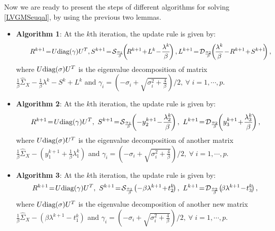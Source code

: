 \documentclass{mcom-l}
\theoremstyle{definition}
\theoremstyle{remark}
\numberwithin{equation}{section}
\begin{document}
Now we are ready to present the steps of different algorithms for solving \eqref{LVGMSeuqal}, by using the previous two lemmas.

 \begin{itemize}
\item {\bf Algorithm 1}: At the $k$th iteration, the update rule is given by:
{\small$$
\qquad R^{k+1} \!=\! U \hbox{diag}(\gamma) U^T, S^{k+1}\!=\!{\mathcal{S}}_{\frac{\alpha_1}{\beta}}\!\!\left(\! R^{k+1} \!+\! L^k \!-\! \frac{\lambda^k}{\beta} \!\right), L^{k+1} \!=\! {\mathcal{D}}_{\frac{\alpha_2}{\beta}}\!\!\left(\! \frac{\lambda^k}{\beta} \!-\! R^{k+1} \!+\! S^{k+1} \!\!\right),
$$}
where $U \hbox{diag}(\sigma)U^T$ is the eigenvalue decomposition of matrix $\frac{1}{\beta}\hat{\Sigma}_{X} \!-\! \frac{1}{\beta}\lambda^k \!-\! S^k \!+\! L^k$ and
$\gamma_i = \left( -\sigma_i + \sqrt{\sigma_i^2 + \frac{4}{\beta}} \right)/2,\ \forall \;i = 1,\cdots,p.$

\item {\bf{Algorithm 2}}: At the $k$th iteration, the update rule is given by:
{\small$$
\qquad R^{k+1}\!=\! U \hbox{diag}(\gamma) U^T,\  S^{k+1}\!=\!{\mathcal{S}}_{\frac{\alpha_1}{\beta}}\!\!\left( - y_2^{k+1} \!-\! \frac{\lambda_2^k}{\beta} \!\right),\ L^{k+1} \!=\! {\mathcal{D}}_{\frac{\alpha_2}{\beta}}\!\!\left( y_3^{k+1} \!+\! \frac{\lambda_3^k}{\beta} \!\right),
$$}
where $U \hbox{diag}(\sigma)U^T$ is the eigenvalue decomposition of another matrix $\frac{1}{\beta}\hat{\Sigma}_{X} \!-\! (y_1^{k+1} \!+\! \frac{1}{\beta}\lambda_1^k)$ and
$\gamma_i = \left( -\sigma_i + \sqrt{\sigma_i^2 + \frac{4}{\beta}} \right)/2,\ \forall\; i = 1,\cdots,p.$

\item {\bf {Algorithm 3}}: At the $k$th iteration, the update rule is given by:
{\small$$
\qquad R^{k+1}\!=\! U \hbox{diag}(\gamma) U^T,\ S^{k+1}\!=\!{\mathcal{S}}_{\frac{\alpha_1}{\beta}}\!\left( - \beta \lambda^{k+1} \!+\! t_2^k \!\right),\ L^{k+1} \!=\! {\mathcal{D}}_{\frac{\alpha_2}{\beta}}\!\left(\! \beta \lambda^{k+1} \!-\! t_3^k \!\right),
$$}
where $U \hbox{diag}(\sigma)U^T$ is the eigenvalue decomposition of another new matrix $\frac{1}{\beta}\hat{\Sigma}_{X} \!-\! (\beta \lambda^{k+1} \!-\! t_1^k)$ and
$\gamma_i = \left( -\sigma_i + \sqrt{\sigma_i^2 + \frac{4}{\beta}} \right)/2,\ \forall\; i = 1,\cdots,p.$
\end{itemize}
\end{document}
